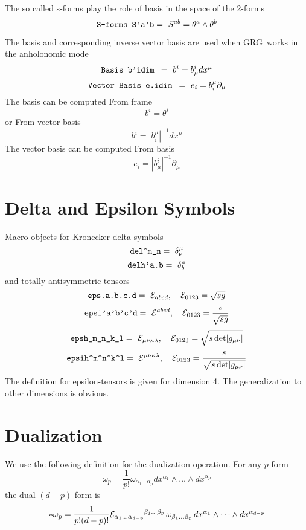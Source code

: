 \documentclass[twoside,openright]{report}
\newcommand{\grgtt}{\ttfamily}
\newcommand{\object}[2]{%
\begin{equation}
\mbox{\comm{#1}} =\ #2
\end{equation}}
\newcommand{\seethis}[1]{\marginpar{\footnotesize\it #1}}
\renewcommand{\tt}{\grgtt}
\def\^{{\tt \char'136}}                     %
\def\_{{\tt \char'137}}                     %
\newcommand{\grg}{{\sc GRG}}
\newcommand{\comm}[1]{{\upshape\tt#1}}    %
\begin{document}
The so called s-forms play the role of basis in the space of the
2-forms
\object{S-forms  S'a'b}{S^{ab}=\theta^a\wedge\theta^b}

The basis and corresponding inverse vector basis are used
when \grg\ works in the anholonomic mode
\seethis{See page \pageref{amode}.}
\object{Basis  b'idim }{b^i=b^i_\mu dx^\mu}
\object{Vector Basis  e.idim }{e_i=b_i^\mu\partial_\mu}
The basis can be computed {\tt From frame}
\begin{equation}
b^i=\theta^i
\end{equation}
or {\tt From vector basis}
\begin{equation}
b^i = |b_i^\mu|^{-1}dx^\mu
\end{equation}
The vector basis can be computed {\tt From basis}
\begin{equation}
e_i = |b^i_\mu|^{-1}\partial_\mu
\end{equation}


\section{Delta and Epsilon Symbols}

Macro objects for Kronecker delta symbols
\object{del\^m\_n}{\delta^\mu_\nu}
\object{delh'a.b}{\delta^a_b}
and totally antisymmetric tensors
\object{eps.a.b.c.d}{{\cal E}_{abcd},\quad{\cal E}_{0123}=\sqrt{sg}}
\object{epsi'a'b'c'd}{{\cal E}^{abcd},\quad{\cal E}_{0123}=\frac{s}{\sqrt{sg}}}
\object{epsh\_m\_n\_k\_l}{{\cal E}_{\mu\nu\kappa\lambda},\quad{\cal E}_{0123}=\sqrt{s\,{\rm det}|g_{\mu\nu}|}}
\object{epsih\^m\^n\^k\^l}{{\cal E}^{\mu\nu\kappa\lambda},\quad{\cal E}_{0123}=\frac{s}{\sqrt{s\,{\rm det}|g_{\mu\nu}|}}}
The definition for epsilon-tensors is given for dimension 4.
The generalization to other dimensions is obvious.


\section{Dualization}

We use the following definition for the dualization
operation. For any $p$-form
\begin{equation}
\omega_p=\frac{1}{p!}\omega_{\alpha_1\dots\alpha_p}dx^{\alpha_1}\wedge
\dots\wedge dx^{\alpha_p}
\end{equation}
the dual $(d-p)$-form is
\begin{equation}
*\omega_p=\frac{1}{p!(d-p)!}{\cal E}_{\alpha_1\dots\alpha_{d-p}}
{}^{\beta_1\dots\beta_p}\,\omega_{\beta_1\dots\beta_p}\,
dx^{\alpha_1}\wedge\dots\wedge dx^{\alpha_{d-p}}
\end{equation}
\end{document}
